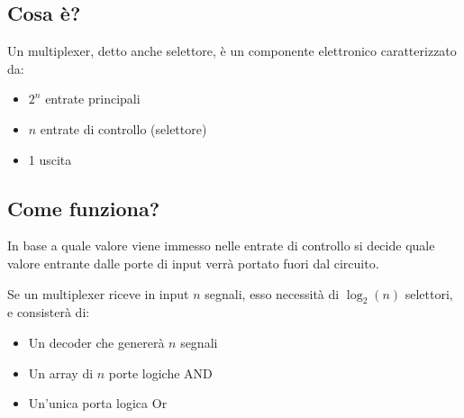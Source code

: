 \subsection{Cosa è?}
Un multiplexer, detto anche selettore, è un componente elettronico caratterizzato da:
\begin{itemize}
    \item $2^n$ entrate principali
    \item $n$ entrate di controllo (selettore)
    \item 1 uscita
\end{itemize}

\subsection{Come funziona?}
In base a quale valore viene immesso nelle entrate di controllo si decide quale valore entrante dalle porte di input verrà portato fuori dal circuito.

Se un multiplexer riceve in input $n$ segnali, esso necessità di $\log_2(n)$ selettori, e consisterà di:
\begin{itemize}
    \item Un decoder che genererà $n$ segnali
    \item Un array di $n$ porte logiche AND
    \item Un'unica porta logica Or
\end{itemize}


